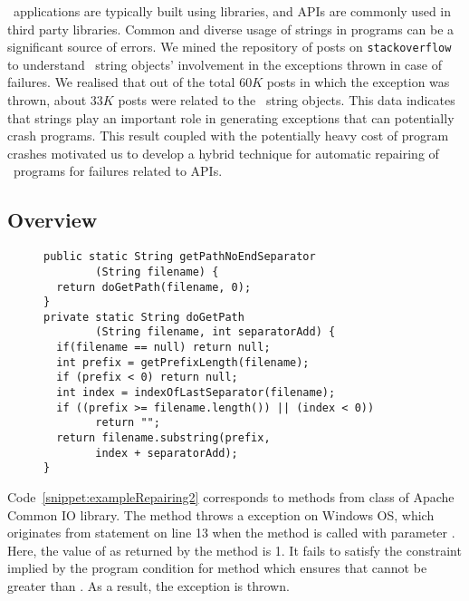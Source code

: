 \java\ applications are typically built using libraries, and  APIs
are commonly used in third party libraries. Common and diverse usage of strings
in programs can be a significant source of errors. We mined the repository of posts
on \texttt{stackoverflow}~\cite{stackoverflow} to understand \java\ string objects'
involvement in the exceptions thrown in case of failures. We realised that out
of the total $60K$ posts in which the exception was thrown, about $33K$ posts were
related to the \java\ string objects. 
This data indicates that strings play an important
role in generating exceptions that can potentially crash programs. This result
coupled with the potentially
heavy cost of program crashes motivated us to develop a hybrid technique for
automatic repairing of \java\ programs for failures related to 
APIs.

\subsection{Overview}
\label{subsec:overview}

\begin{figure}[t]
\centering
\begin{lstlisting}
public static String getPathNoEndSeparator
        (String filename) {
  return doGetPath(filename, 0);
}
private static String doGetPath
        (String filename, int separatorAdd) {
  if(filename == null) return null;
  int prefix = getPrefixLength(filename);
  if (prefix < 0) return null;
  int index = indexOfLastSeparator(filename);
  if ((prefix >= filename.length()) || (index < 0))
        return "";
  return filename.substring(prefix,
        index + separatorAdd);
}
\end{lstlisting}
\end{figure}

Code~\ref{snippet:exampleRepairing2} corresponds to methods from
 class of Apache Common IO library. The method
 throws a  exception
on Windows OS, which originates from statement  on line 13 when the method is
called with parameter .  Here, the value of  as
returned by the method  is 1. It fails to satisfy the
constraint implied by the program condition  for  method which  ensures that 
cannot be greater than . As a result, the exception is thrown.


